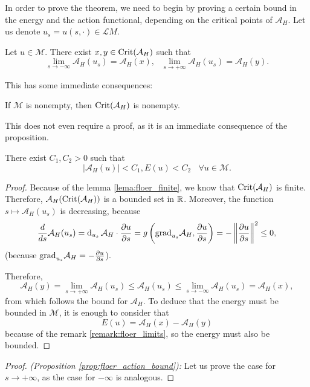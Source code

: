 In order to prove the theorem, we need to begin by proving a certain bound in the energy and the action functional, depending on the critical points of $\mathcal{A}_H$. Let us denote $u_s = u(s,\cdot) \in \mathcal{L}M$.

\begin{prop} \label{prop:floer_action_bound}
Let $u \in \mathcal{M}$. There exist $x,y \in \text{Crit}(\mathcal{A}_H)$ such that
\[\lim_{s \rightarrow -\infty} \mathcal{A}_H(u_s) = \mathcal{A}_H(x), \ \ \ \lim_{s \rightarrow +\infty} \mathcal{A}_H(u_s) = \mathcal{A}_H(y) .\]
\end{prop}

This has some immediate consequences:

\begin{coro}
If $\mathcal{M}$ is nonempty, then $\text{Crit}(\mathcal{A}_H)$ is nonempty.
\end{coro}

This does not even require a proof, as it is an immediate consequence of the proposition.

\begin{coro} \label{coro:floer_energy_bound}
There exist $C_1, C_2 > 0$ such that
\[|\mathcal{A}_H(u)| < C_1 , E(u) < C_2 \ \ \ \ \forall u \in \mathcal{M} .\]
\end{coro}

\begin{proof}
Because of the lemma \ref{lema:floer_finite}, we know that $\text{Crit}(\mathcal{A}_H)$ is finite. Therefore, $\mathcal{A}_H(\text{Crit}(\mathcal{A}_H))$ is a bounded set in $\mathbb{R}$. Moreover, the function $s \mapsto \mathcal{A}_H(u_s)$ is decreasing, because
\[\frac{d}{ds} \mathcal{A}_H(u_s) = \operatorname d_{u_s} \mathcal{A}_H \cdot \frac{\partial u}{\partial s} = g\left( \text{grad}_{u_s} \mathcal{A}_H, \frac{\partial u}{\partial s} \right) = - \left\|\frac{\partial u}{\partial s}\right\|^2 \leq 0 ,\]
(because $\text{grad}_{u_s}\mathcal{A}_H = - \frac{\partial u}{\partial s}$).

Therefore,
\[\mathcal{A}_H(y) = \lim_{s \rightarrow +\infty} \mathcal{A}_H(u_s) \leq \mathcal{A}_H(u_s) \leq \lim_{s \rightarrow -\infty} \mathcal{A}_H(u_s) = \mathcal{A}_H(x) ,\]
from which follows the bound for $\mathcal{A}_H$. To deduce that the energy must be bounded in $\mathcal{M}$, it is enough to consider that
\[E(u) = \mathcal{A}_H(x) - \mathcal{A}_H(y)\]
because of the remark \ref{remark:floer_limits}, so the energy must also be bounded.
\end{proof}

\begin{proof} {\it (Proposition \ref{prop:floer_action_bound}):} Let us prove the case for $s \rightarrow +\infty$, as the case for $-\infty$ is analogous.
\end{proof}
